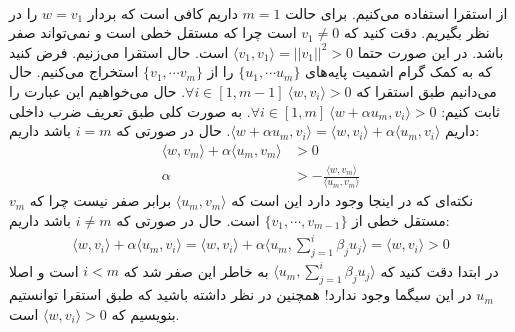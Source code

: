\\
از استقرا استفاده می‌کنیم. برای حالت
$m=1$
داریم کافی است که بردار
$w = v_1$
را در نظر بگیریم. دقت کنید که
$v_1 \neq 0$
است چرا که مستقل خطی است و نمی‌تواند صفر باشد.
در این صورت حتما
$\langle v_1, v_1 \rangle = ||v_1||^2 > 0$
است.
حال استقرا می‌زنیم. فرض کنید که به کمک گرام اشمیت پایه‌های
$\lbrace u_1, \cdots u_m \rbrace$ را از $\lbrace v_1, \cdots v_m \rbrace$
استخراج می‌کنیم. حال می‌دانیم طبق استقرا که
$\forall i \in [1, m-1] ~ \langle w, v_i \rangle > 0$.
حال می‌خواهیم این عبارت را ثابت کنیم:
$\forall i \in [1, m] ~ \langle w + \alpha u_m, v_i \rangle > 0$.
به صورت کلی طبق تعریف ضرب داخلی داریم
$\langle w + \alpha u_m, v_i \rangle = \langle w , v_i \rangle + \alpha \langle u_m, v_i \rangle$.
حال در صورتی که
$i = m$
باشد داریم:
\begin{align*}
    \langle w , v_m \rangle + \alpha \langle u_m, v_m \rangle &> 0\\
    \alpha &> -\frac{\langle w , v_m \rangle}{\langle u_m, v_m \rangle}
\end{align*}
نکته‌ای که در اینجا وجود دارد این است که
$\langle u_m, v_m \rangle$
برابر صفر نیست چرا که
$v_m$
مستقل خطی از
$\lbrace v_1, \cdots, v_{m-1} \rbrace$
است.
حال در صورتی که
$i \neq m$
باشد داریم:
\begin{gather*}
    \langle w , v_i \rangle + \alpha \langle u_m, v_i \rangle =
    \langle w , v_i \rangle + \alpha \langle u_m, \sum_{j=1}^{i} \beta_j u_j \rangle =
    \langle w , v_i \rangle > 0
\end{gather*}
در ابتدا دقت کنید که
$\langle u_m, \sum_{j=1}^{i} \beta_j u_j \rangle$
به خاطر این صفر شد که
$i < m$
است و اصلا
$u_m$
در این سیگما وجود ندارد!
همچنین در نظر داشته باشید که طبق استقرا توانستیم بنویسیم که
$\langle w , v_i \rangle > 0$
است.
